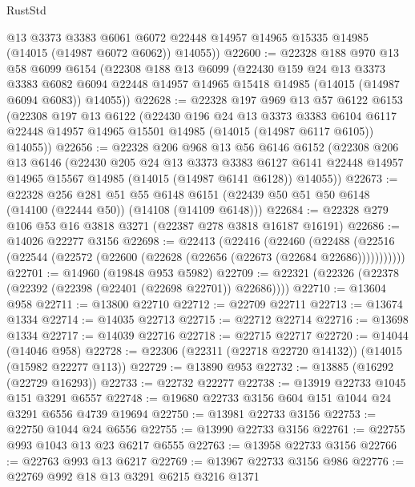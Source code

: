 \begin{lexlean}{RustStd}
\begin{coremodule}
        @13
        @3373
        @3383
        @6061
        @6072
        @22448
        @14957
        @14965
        @15335
        @14985
        (@14015 (@14987 @6072 @6062))
        @14055))
@22600 := @22328
    @188
    @970
    @13
    @58
    @6099
    @6154
    (@22308
      @188
      @13
      @6099
      (@22430
        @159
        @24
        @13
        @3373
        @3383
        @6082
        @6094
        @22448
        @14957
        @14965
        @15418
        @14985
        (@14015 (@14987 @6094 @6083))
        @14055))
@22628 := @22328
    @197
    @969
    @13
    @57
    @6122
    @6153
    (@22308
      @197
      @13
      @6122
      (@22430
        @196
        @24
        @13
        @3373
        @3383
        @6104
        @6117
        @22448
        @14957
        @14965
        @15501
        @14985
        (@14015 (@14987 @6117 @6105))
        @14055))
@22656 := @22328
    @206
    @968
    @13
    @56
    @6146
    @6152
    (@22308
      @206
      @13
      @6146
      (@22430
        @205
        @24
        @13
        @3373
        @3383
        @6127
        @6141
        @22448
        @14957
        @14965
        @15567
        @14985
        (@14015 (@14987 @6141 @6128))
        @14055))
@22673 := @22328
    @256
    @281
    @51
    @55
    @6148
    @6151
    (@22439 @50 @51 @50 @6148 (@14100 (@22444 @50)) (@14108 (@14109 @6148)))
@22684 := @22328 @279 @106 @53 @16 @3818 @3271 (@22387 @278 @3818 @16187 @16191)
@22686 := @14026 @22277 @3156
@22698 := @22413
    (@22416
      (@22460
        (@22488 (@22516 (@22544 (@22572 (@22600 (@22628 (@22656 (@22673 (@22684 @22686)))))))))))
@22701 := @14960 (@19848 @953 @5982)
@22709 := @22321 (@22326 (@22378 (@22392 (@22398 (@22401 (@22698 @22701)) @22686))))
@22710 := @13604 @958
@22711 := @13800 @22710
@22712 := @22709 @22711
@22713 := @13674 @1334
@22714 := @14035 @22713
@22715 := @22712 @22714
@22716 := @13698 @1334
@22717 := @14039 @22716
@22718 := @22715 @22717
@22720 := @14044 (@14046 @958)
@22728 := @22306 (@22311 (@22718 @22720 @14132)) (@14015 (@15982 @22277 @113))
@22729 := @13890 @953
@22732 := @13885 (@16292 (@22729 @16293))
@22733 := @22732 @22277
@22738 := @13919 @22733 @1045 @151 @3291 @6557
@22748 := @19680 @22733 @3156 @604 @151 @1044 @24 @3291 @6556 @4739 @19694
@22750 := @13981 @22733 @3156
@22753 := @22750 @1044 @24 @6556
@22755 := @13990 @22733 @3156
@22761 := @22755 @993 @1043 @13 @23 @6217 @6555
@22763 := @13958 @22733 @3156
@22766 := @22763 @993 @13 @6217
@22769 := @13967 @22733 @3156 @986
@22776 := @22769 @992 @18 @13 @3291 @6215 @3216 @1371

\end{coremodule}
\end{lexlean}
